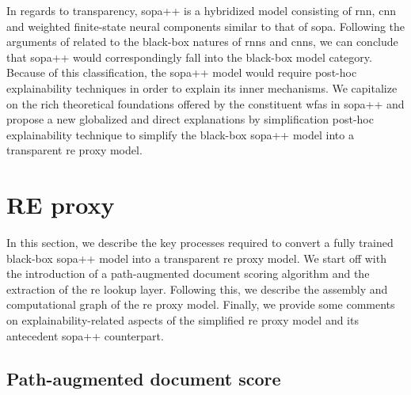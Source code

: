 In regards to transparency, \ac{sopa}++ is a hybridized model consisting of \ac{rnn},
\ac{cnn} and weighted finite-state neural components similar to that of \ac{sopa}.
Following the arguments of \citet{arrieta2020explainable} related to the
black-box natures of \ac{rnn}s and \ac{cnn}s, we can conclude that \ac{sopa}++ would
correspondingly fall into the black-box model category. Because of this
classification, the \ac{sopa}++ model would require post-hoc explainability
techniques in order to explain its inner mechanisms. We capitalize on the rich
theoretical foundations offered by the constituent \ac{wfas} in \ac{sopa}++ and
propose a new globalized and direct explanations by simplification post-hoc
explainability technique to simplify the black-box \ac{sopa}++ model into a
transparent \ac{re} proxy model.

\section{RE proxy}

In this section, we describe the key processes required to convert a fully
trained black-box \ac{sopa}++ model into a transparent \ac{re} proxy model. We start
off with the introduction of a path-augmented document scoring algorithm and the
extraction of the \ac{re} lookup layer. Following this, we describe the assembly
and computational graph of the \ac{re} proxy model. Finally, we provide some
comments on explainability-related aspects of the simplified \ac{re} proxy model
and its antecedent \ac{sopa}++ counterpart.

\subsection{Path-augmented document score}

